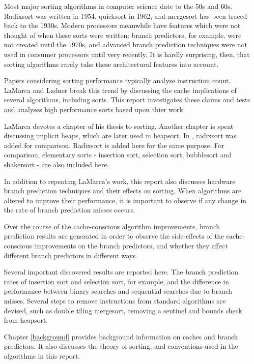 \label{intro}
Most major sorting algorithms in computer science date to the 50s and 60s.
Radixsort was written in 1954, quicksort in 1962, and mergesort has been traced
back to the 1930s. Modern processors meanwhile have features which were not
thought of when these sorts were written: branch predictors, for example, were
not created until the 1970s, and advanced branch prediction techniques were
not used in consumer processors until very recently. It is hardly surprising,
then, that sorting algorithms rarely take these architectural features into
account.

Papers considering sorting performance typically analyse instruction count.
LaMarca and Ladner \cite{LaMarca96} break this trend by discussing the cache
implications of several algorithms, including sorts. This report 
investigates these claims and tests and analyses high performance sorts
based upon thier work.

LaMarca devotes a chapter of his thesis to sorting. Another chapter is spent
discussing implicit heaps, which are later used in heapsort. In
\cite{LaMarca99}, radixsort was added for comparison. Radixsort is added here
for the same purpose. For comparison, elementary sorts - insertion sort,
selection sort, bubblesort and shakersort - are also included here.

In addition to repeating LaMarca's work, this report also discusses hardware
branch prediction techniques and their effects on sorting. When algorithms are
altered to improve their performance, it is important to observe if any change
in the rate of branch prediction misses occurs.

Over the course of the cache-conscious algorithm improvements, branch prediction
results are generated in order to observe the side-effects of the
cache-conscious improvements on the branch predictors, and whether they affect
different branch predictors in different ways. 

Several important discovered results are reported here. The
branch prediction rates of insertion sort and selection sort, for example, and
the difference in performance between binary searches and sequential searches due
to branch misses. Several steps to remove instructions from standard algorithms
are devised, such as double tiling mergesort, removing a sentinel and bounds
check from heapsort.

Chapter \ref{background} provides background information on caches and branch predictors. It
also discusses the theory of sorting, and conventions used in the algorithms in
this report.

